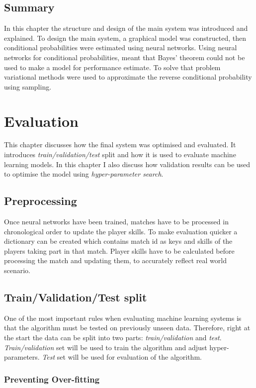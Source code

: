 \documentclass[12pt,a4paper]{book}
\begin{document}
\section{Summary}
In this chapter the structure and design of the main system was introduced and explained.
To design the main system, a graphical model was constructed, then conditional probabilities were estimated using neural networks.
Using neural networks for conditional probabilities, meant that Bayes' theorem could not be used to make a model for performance estimate.
To solve that problem variational methods were used to approximate the reverse conditional probability using sampling.

\chapter{Evaluation}
This chapter discusses how the final system was optimised and evaluated.
It introduces \emph{train/validation/test} split and how it is used to evaluate machine learning models.
In this chapter I also discuss how validation results can be used to optimise the model using \emph{hyper-parameter search}.

\section{Preprocessing}
Once neural networks have been trained, matches have to be processed in chronological order to update the player skills.
To make evaluation quicker a dictionary can be created which contains match id as keys and skills of the players taking part in that match.
Player skills have to be calculated before processing the match and updating them, to accurately reflect real world scenario.
\section{Train/Validation/Test split}
One of the most important rules when evaluating machine learning systems is that the algorithm must be tested on previously unseen data.
Therefore, right at the start the data can be split into two parts: \emph{train/validation} and \emph{test}.
\emph{Train/validation} set will be used to train the algorithm and adjust hyper-parameters.
\emph{Test} set will be used for evaluation of the algorithm.

\subsection{Preventing Over-fitting}
\end{document}
